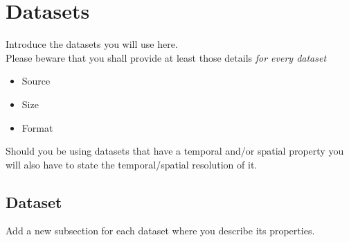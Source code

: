 \section{Datasets}
Introduce the datasets you will use here.\\
Please beware that you shall provide at least those details \emph{for every dataset}

\begin{itemize}
	\item Source
	\item Size
	\item Format
\end{itemize}

Should you be using datasets that have a temporal and/or spatial property you will also have to state the temporal/spatial resolution of it.

\subsection{Dataset}
Add a new subsection for each dataset where you describe its properties.
